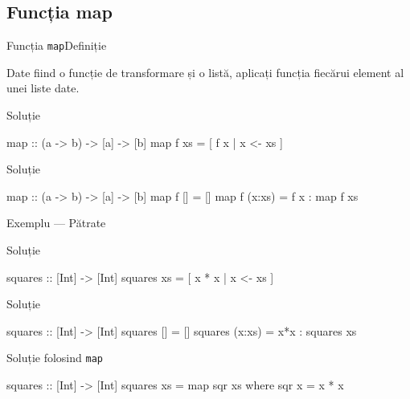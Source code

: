 \documentclass[xcolor=pdftex,romanian,colorlinks]{beamer}
\begin{document}
\subsection{Funcția map}

\begin{frame}[fragile]{Funcția \lstinline$map$}{Definiție}
\begin{block}{}
Date fiind o funcție de transformare și o listă, aplicați funcția fiecărui element al unei liste date.
\end{block}
\begin{block}{Soluție }
\begin{asciihs}
map :: (a -> b) -> [a] -> [b]
map f xs = [ f x | x <- xs ]
\end{asciihs}
\end{block}
\begin{block}{Soluție }
\begin{asciihs}
map :: (a -> b) -> [a] -> [b]
map f []     = []
map f (x:xs) = f x : map f xs
\end{asciihs}
\end{block}
\end{frame}


\begin{frame}[fragile]{Exemplu --- Pătrate}
\begin{block}{Soluție }
\begin{asciihs}
squares :: [Int] -> [Int]
squares xs = [ x * x | x <- xs ]
\end{asciihs}
\end{block}
\begin{block}{Soluție }
\begin{asciihs}
squares :: [Int] -> [Int]
squares []     = []
squares (x:xs) = x*x : squares xs
\end{asciihs}
\end{block}
\begin{block}{Soluție folosind \lstinline$map$}
\begin{asciihs}
squares :: [Int] -> [Int]
squares xs = map sqr xs
  where sqr x = x * x
\end{asciihs}
\end{block}
\end{frame}
\end{document}
